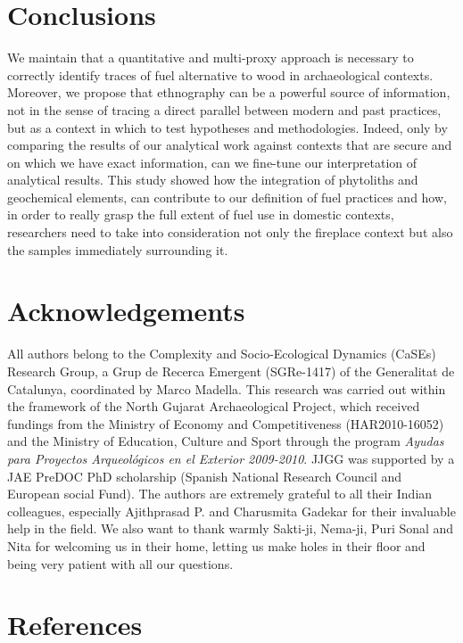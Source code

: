 \documentclass[authoryear,preprint,review,12pt]{elsarticle}
\begin{document}
\section{Conclusions}
\label{sec:5}
We maintain that a quantitative and multi-proxy approach is necessary to correctly identify traces of fuel alternative to wood in archaeological contexts. Moreover, we propose that ethnography can be a powerful source of information, not in the sense of tracing a direct parallel between modern and past practices, but as a context in which to test hypotheses and methodologies. Indeed, only by comparing the results of our analytical work against contexts that are secure and on which we have exact information, can we fine-tune our interpretation of analytical results. This study showed how the integration of phytoliths and geochemical elements, can contribute to our definition of fuel practices and how, in order to really grasp the full extent of fuel use in domestic contexts, researchers need to take into consideration not only the fireplace context but also the samples immediately surrounding it.

\section{Acknowledgements}
\label{sec:acknowledgements}
All authors belong to the Complexity and Socio-Ecological Dynamics (CaSEs) Research Group, a Grup de Recerca Emergent (SGRe-1417) of the Generalitat de Catalunya, coordinated by Marco Madella. This research was carried out within the framework of the North Gujarat Archaeological Project, which received fundings from the Ministry of Economy and Competitiveness (HAR2010-16052) and the Ministry of Education, Culture and Sport through the program \textit{Ayudas para Proyectos Arqueológicos en el Exterior 2009-2010}. JJGG was supported by a JAE PreDOC PhD scholarship (Spanish National Research Council and European social Fund). The authors are extremely grateful to all their Indian colleagues, especially Ajithprasad P. and Charusmita Gadekar for their invaluable help in the field. We also want to thank warmly Sakti-ji, Nema-ji, Puri Sonal and Nita for welcoming us in their home, letting us make holes in their floor and being very patient with all our questions.

\section{References}




\end{document}
